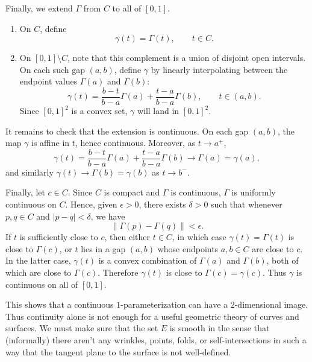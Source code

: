 \begin{example}
		Finally, we extend $\Gamma$ from $C$ to all of $[0,1]$. 
		\begin{enumerate}
		  \item On $C$, define
				\begin{equation}
					\gamma(t) = \Gamma(t), \qquad t \in C.
				\end{equation}
			
			\item On $[0, 1] \setminus C$, note that this complement is a union of disjoint open intervals. On each such gap $(a,b)$, define $\gamma$ by linearly interpolating between the endpoint values $\Gamma(a)$ and $\Gamma(b)$:
				\begin{equation}
					\gamma(t) = \frac{b-t}{b-a}\Gamma(a) + \frac{t-a}{b-a}\Gamma(b), \qquad t \in (a,b).
				\end{equation}
				Since $[0, 1]^2$ is a convex set, $\gamma$ will land in $[0, 1]^2$. 
		\end{enumerate}
			
		It remains to check that the extension is continuous. On each gap $(a,b)$, the map $\gamma$ is affine in $t$, hence continuous. Moreover, as $t \to a^+$,
		\begin{equation}
			\gamma(t) = \frac{b-t}{b-a}\Gamma(a) + \frac{t-a}{b-a}\Gamma(b) \longrightarrow \Gamma(a) = \gamma(a),
		\end{equation}
		and similarly $\gamma(t)\to \Gamma(b)=\gamma(b)$ as $t\to b^-$.
			
		Finally, let $c\in C$. Since $C$ is compact and $\Gamma$ is continuous, $\Gamma$ is uniformly continuous on $C$. Hence, given $\epsilon>0$, there exists $\delta>0$ such that whenever $p,q\in C$ and $|p-q|<\delta$, we have
		\begin{equation}
			\|\Gamma(p)-\Gamma(q)\|<\epsilon.
		\end{equation}
		If $t$ is sufficiently close to $c$, then either $t\in C$, in which case $\gamma(t)=\Gamma(t)$ is close to $\Gamma(c)$, or $t$ lies in a gap $(a,b)$ whose endpoints $a,b\in C$ are close to $c$. In the latter case, $\gamma(t)$ is a convex combination of $\Gamma(a)$ and $\Gamma(b)$, both of which are close to $\Gamma(c)$. Therefore $\gamma(t)$ is close to $\Gamma(c)=\gamma(c)$. Thus $\gamma$ is continuous on all of $[0,1]$.
	\end{example}
			
	This shows that a continuous $1$-parameterization can have a $2$-dimensional image. Thus continuity alone is not enough for a useful geometric theory of curves and surfaces. We must make sure that the set $E$ is smooth in the sense that (informally) there aren't any wrinkles, points, folds, or self-intersections in such a way that the tangent plane to the surface is not well-defined. 
			
